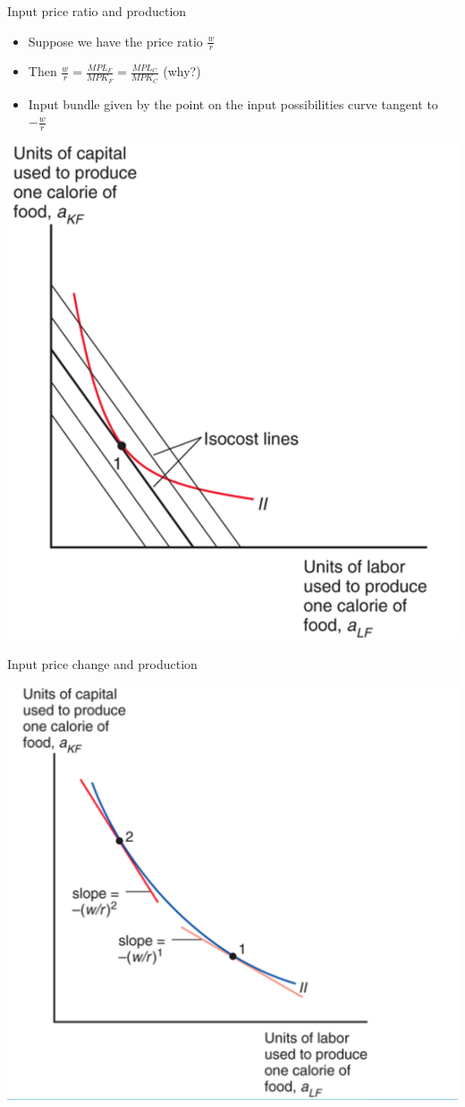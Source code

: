 \documentclass[ignorenonframetext,]{beamer}
\begin{document}
\begin{frame}{Input price ratio and production}

    \begin{itemize}
        \item Suppose we have the price ratio $\frac{w}{r}$
        \item Then $\frac{w}{r} = \frac{MPL_F}{MPK_F} = \frac{MPL_C}{MPK_C}$ (why?)
        \item Input bundle given by the point on the input possibilities curve tangent to $-\frac{w}{r}$
    \end{itemize}
    \includegraphics[scale=0.15]{input_cost.png}

\end{frame}

\begin{frame}{Input price change and production}

    \includegraphics[scale=0.25]{factor_price_change.png}

\end{frame}
\end{document}
